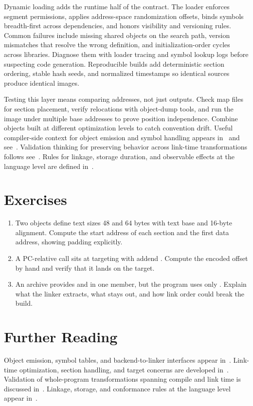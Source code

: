 Dynamic loading adds the runtime half of the contract.
The loader enforces segment permissions, applies address-space randomization offsets, binds symbols breadth-first across dependencies, and honors visibility and versioning rules.
Common failures include missing shared objects on the search path, version mismatches that resolve the wrong definition, and initialization-order cycles across libraries.
Diagnose them with loader tracing and symbol lookup logs before suspecting code generation.
Reproducible builds add deterministic section ordering, stable hash seeds, and normalized timestamps so identical sources produce identical images.

Testing this layer means comparing addresses, not just outputs.
Check map files for section placement, verify relocations with object-dump tools, and run the image under multiple base addresses to prove position independence.
Combine objects built at different optimization levels to catch convention drift.
Useful compiler-side context for object emission and symbol handling appears in~\cite{appel-1998-modern} and see~\cite{morgan-1998-optimizing}.
Validation thinking for preserving behavior across link-time transformations follows see~\cite{safonov-2010-trustworthy}.
Rules for linkage, storage duration, and observable effects at the language level are defined in~\cite{wg14-2011-c11}.

\section{Exercises}\label{sec:ch29-exercises}

\begin{enumerate}
\item Two objects define text sizes 48 and 64 bytes with text base  and 16-byte alignment. \label{ex:ch29-layout} Compute the start address of each section and the first data address, showing padding explicitly.
\item A PC-relative call sits at  targeting  with addend . \label{ex:ch29-pcrel} Compute the encoded offset by hand and verify that it lands on the target.
\item An archive provides  and  in one member, but the program uses only . \label{ex:ch29-archive} Explain what the linker extracts, what stays out, and how link order could break the build.
\end{enumerate}

\section{Further Reading}\label{sec:ch29-reading}

Object emission, symbol tables, and backend-to-linker interfaces appear in~\cite{appel-1998-modern}.
Link-time optimization, section handling, and target concerns are developed in~\cite{morgan-1998-optimizing}.
Validation of whole-program transformations spanning compile and link time is discussed in~\cite{safonov-2010-trustworthy}.
Linkage, storage, and conformance rules at the language level appear in~\cite{wg14-2011-c11}.
